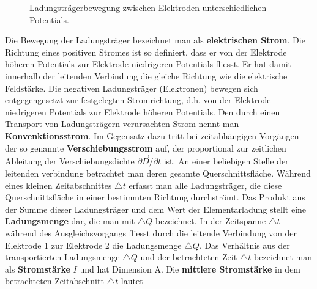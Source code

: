 \begin{figure}[H]
\centering
\caption{Ladungsträgerbewegung zwischen Elektroden unterschiedlichen Potentials.}
\label{fig_IIb}
\end{figure}
\noindent Die Bewegung der Ladungsträger bezeichnet man als \textbf{elektrischen Strom}. Die Richtung eines positiven Stromes ist so definiert, dass er von der Elektrode höheren Potentials zur Elektrode niedrigeren Potentials fliesst. Er hat damit innerhalb der leitenden Verbindung die gleiche Richtung wie die elektrische Feldstärke.
\newline\newline
Die negativen Ladungsträger (Elektronen) bewegen sich entgegengesetzt zur festgelegten Stromrichtung, d.h. von der Elektrode niedrigeren Potentials zur Elektrode höheren Potentials. Den durch einen Transport von Ladungsträgern verursachten Strom nennt man \textbf{Konvenktionsstrom}. Im Gegensatz dazu tritt bei zeitabhängigen Vorgängen der so genannte \textbf{Verschiebungsstrom} auf, der proportional zur zeitlichen Ableitung der Verschiebungsdichte $\partial \overrightarrow{D}/\partial t$ ist.
\newline\newline
An einer beliebigen Stelle der leitenden verbindung betrachtet man deren gesamte Querschnittsfläche. Während eines kleinen Zeitabschnittes $\triangle t$ erfasst man alle Ladungsträger, die diese Querschnittsfläche in einer bestimmten Richtung durchströmt. Das Produkt aus der Summe dieser Ladungsträger und dem Wert der Elementarladung stellt eine \textbf{Ladungsmenge} dar, die man mit $\triangle Q$ bezeichnet. In der Zeitspanne $\triangle t$ während des Ausgleichsvorgangs fliesst durch die leitende Verbindung von der Elektrode 1 zur Elektrode 2 die Ladungsmenge $\triangle Q$. 
\newline \newline
Das Verhältnis aus der transportierten Ladungsmenge $\triangle Q$ und der betrachteten Zeit $\triangle t$ bezeichnet man als \textbf{Stromstärke} $I$ und hat Dimension A. Die \textbf{mittlere Stromstärke} in dem betrachteten Zeitabschnitt $\triangle t$ lautet
